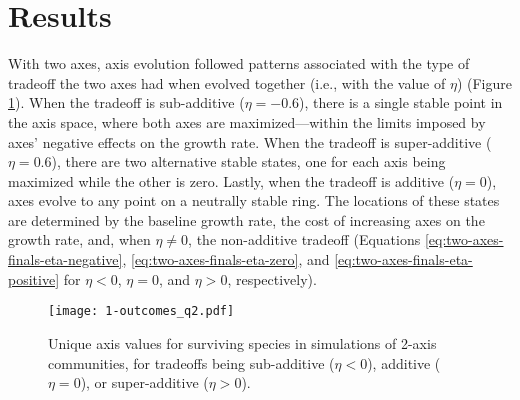 \section*{Results}


With two axes, axis evolution followed patterns associated with the type 
of tradeoff the two axes had when evolved together
(i.e., with the value of $\eta$)
(Figure \ref{fig:two-axis-outcomes}).
When the tradeoff is sub-additive ($\eta = -0.6$), there is a single
stable point in the axis space, where both axes are
maximized---within the limits imposed by axes' negative effects on 
the growth rate.
When the tradeoff is super-additive ($\eta = 0.6$), there are two
alternative stable states, one for each axis being maximized while the 
other is zero.
Lastly, when the tradeoff is additive ($\eta = 0$), axes
evolve to any point on a neutrally stable ring.
The locations of these states are determined by 
the baseline growth rate, 
the cost of increasing axes on the growth rate,
and, when $\eta \ne 0$, the non-additive tradeoff
(Equations \ref{eq:two-axes-finals-eta-negative},
\ref{eq:two-axes-finals-eta-zero}, and 
\ref{eq:two-axes-finals-eta-positive} for 
$\eta < 0$, $\eta = 0$, and $\eta > 0$, respectively).

\begin{figure}[ht!]
\centering
\texttt{[image: 1-outcomes\_q2.pdf]}
\caption{Unique axis values for surviving species in simulations of 2-axis communities,
    for tradeoffs being sub-additive ($\eta < 0$), additive ($\eta = 0$), or 
    super-additive ($\eta > 0$).}
\label{fig:two-axis-outcomes}
\end{figure}


